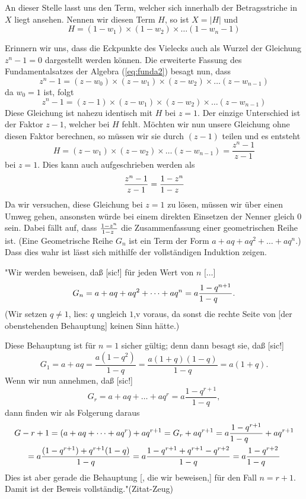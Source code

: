 \documentclass[a4paper,12pt]{article} %
\begin{document}
An dieser Stelle lasst uns den Term, welcher sich innerhalb der Betragsstriche in $X$ liegt ansehen.
Nennen wir diesen Term $H$, so ist $X=|H|$ und
\begin{equation}\label{H}
	H=(1-w_1)\times(1-w_2)\times\dots(1-w_n-1)
\end{equation}

Erinnern wir uns, dass die Eckpunkte des Vielecks auch als Wurzel der Gleichung $z^n-1=0$ dargestellt werden können. Die erweiterte Fassung des Fundamentalsatzes der Algebra (\ref{eq:funda2}) besagt nun, dass
\[z^n-1=(z-w_0)\times(z-w_1)\times(z-w_2)\times\dots(z-w_{n-1})\]
da $w_0=1$ ist, folgt
\[z^n-1=(z-1)\times(z-w_1)\times(z-w_2)\times\dots(z-w_{n-1})\]
Diese Gleichung ist nahezu identisch mit $H$ bei $z=1$.
Der einzige Unterschied ist der Faktor $z-1$, welcher bei $H$ fehlt.
Möchten wir nun unsere Gleichung ohne diesen Faktor berechnen, so müssen wir sie durch $(z-1)$ teilen und es entsteht
\begin{equation}\label{frac}
	H=(z-w_1)\times(z-w_2)\times\dots(z-w_{n-1})=\frac{z^n-1}{z-1}
\end{equation}
bei $z=1$. Dies kann auch aufgeschrieben werden als
\[\frac{z^n-1}{z-1}=\frac{1-z^n}{1-z\hspace{2mm}}\]
Da wir versuchen, diese Gleichung bei $z=1$ zu lösen, müssen wir über einen Umweg gehen, ansonsten würde bei einem direkten Einsetzen der Nenner gleich $0$ sein.
Dabei fällt auf, dass $\frac{1-z^n}{1-z\hspace{1mm}}$ die Zusammenfassung einer geometrischen Reihe ist.
(Eine Geometrische Reihe $G_n$ ist ein Term der Form $a+aq+aq^2+\dots+aq^n$.)
Dass dies wahr ist lässt sich mithilfe der vollständigen Induktion zeigen.

"Wir werden beweisen, daß [sic!] für jeden Wert von $n$ [$\dots$]
\begin{equation}
	G_n=a+aq+aq^2+\dots+aq^n=a\frac{1-q^{n+1}}{1-q\hspace{6mm}}.
\end{equation} 
(Wir setzen $q\ne1$, lies: $q$ ungleich $1$,v voraus, da sonst die rechte Seite von [der obenstehenden Behauptung] keinen Sinn hätte.)

Diese Behauptung ist für $n=1$ sicher gültig; denn dann besagt sie, daß [sic!]
\[G_1=a+aq=\frac{a(1-q^2)}{1-q}=\frac{a(1+q)(1-q)}{1-q}=a(1+q).\]
Wenn wir nun annehmen, daß [sic!]
\[G_r=a+aq+\dots+aq^r=a\frac{1-q^{r+1}}{1-q},\]
dann finden wir als Folgerung daraus
\begin{multline}
	G-{r+1}=(a+aq+\dots+aq^r)+aq^{r+1}=G_r+aq^{r+1}=a\frac{1-q^{r+1}}{1-q\hspace{6mm}}+aq^{r+1}\\
	=a\frac{(1-q^{r+1})+q^{r+1}(1-q)}{1-q}=a\frac{1-q^{r+1}+q^{r+1}-q^{r+2}}{1-q}=a\frac{1-q^{r+2}}{1-q\hspace{6mm}}
\end{multline}
Dies ist aber gerade die Behauptung [, die wir beweisen,] für den Fall $n=r+1$. Damit ist der Beweis vollständig."(Zitat-Zeug)
\end{document}
